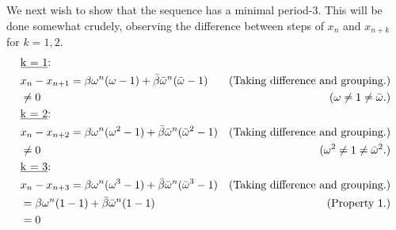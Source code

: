 \begin{solution}
We next wish to show that the sequence has a minimal period-3. This will be done somewhat crudely, observing the difference between steps of $x_n$ and $x_{n + k}$ for $k = 1, 2$.  
\vspace{-5mm}
\alignbreak
\vspace{-5mm}
\begin{align}
    &\text{\underline{k = 1}:}\nonumber\\
    &x_n - x_{n + 1} = \beta \omega^n(\omega - 1) + \Bar{\beta}\Bar{\omega}^n(\Bar{\omega} - 1) &\text{(Taking difference and grouping.)}\nonumber\\
    &\neq 0 &(\omega \neq 1 \neq \Bar{\omega}.)\nonumber\\
    &\text{\underline{k = 2}:}\nonumber\\
    &x_n - x_{n + 2} = \beta \omega^n(\omega^2 - 1) + \Bar{\beta}\Bar{\omega}^n(\Bar{\omega}^2 - 1) &\text{(Taking difference and grouping.)}\nonumber\\
    &\neq 0 &(\omega^2 \neq 1 \neq \Bar{\omega}^2.)\nonumber\\
    &\text{\underline{k = 3}:}\nonumber\\
    &x_n - x_{n + 3} = \beta \omega^n(\omega^3 - 1) + \Bar{\beta}\Bar{\omega}^n(\Bar{\omega}^3 - 1) &\text{(Taking difference and grouping.)}\nonumber\\
    &= \beta \omega^n (1- 1) + \Bar{\beta}\Bar{\omega}^n (1- 1) &\text{(Property 1.)}\nonumber\\
    &= 0 \nonumber
\end{align}
\vspace{-15mm}
\alignbreak


\end{solution}
